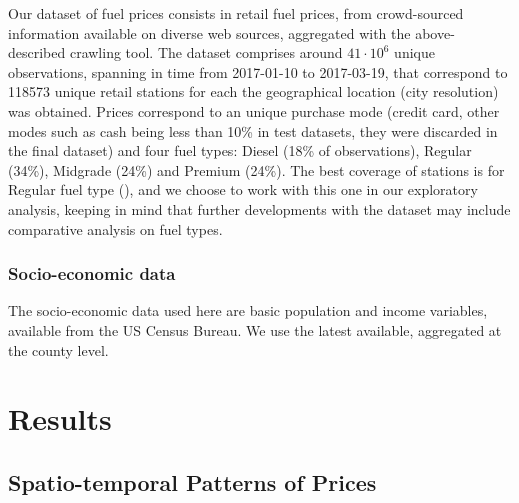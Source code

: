 \documentclass[3p,times,procedia]{elsarticle}
\begin{document}
Our dataset of fuel prices consists in retail fuel prices, from crowd-sourced information available on diverse web sources, aggregated with the above-described crawling tool. The dataset comprises around $41\cdot 10^6$ unique observations, spanning in time from 2017-01-10 to 2017-03-19, that correspond to 118573 unique retail stations for each the geographical location (city resolution) was obtained.  Prices correspond to an unique purchase mode (credit card, other modes such as cash being less than 10\% in test datasets, they were discarded in the final dataset) and four fuel types: Diesel (18\% of observations), Regular (34\%), Midgrade (24\%) and Premium (24\%). The best coverage of stations is for Regular fuel type (), and we choose to work with this one in our exploratory analysis, keeping in mind that further developments with the dataset may include comparative analysis on fuel types.






\subsubsection{Socio-economic data}

The socio-economic data used here are basic population and income variables, available from the US Census Bureau. We use the latest available, aggregated at the county level.



\section{Results}


\subsection{Spatio-temporal Patterns of Prices}\label{subsec:patterns}


\end{document}
